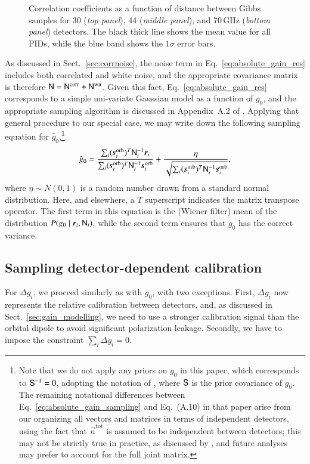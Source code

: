\documentclass[twocolumn]{aa}
\newcommand{\n}[0]{\vec{n}}
\newcommand{\N}[0]{\tens{N}}
\renewcommand{\S}[0]{\tens{S}}
\renewcommand{\r}[0]{\vec{r}}
\newcommand{\tot}[0]{^{\mathrm{tot}}}
\newcommand{\corr}[0]{^{\mathrm{corr}}}
\newcommand{\wn}[0]{^{\mathrm{wn}}}
\begin{document}
\begin{figure}[t]
    \caption{Correlation coefficients as a function of distance between Gibbs samples for 30 (\emph{top panel}), 44 (\emph{middle panel}), and 70\,GHz (\emph{bottom panel}) detectors. The black thick line shows the mean value for all PIDs, while the blue band shows the $1\sigma$ error bars.}
  \label{fig:corrlengths}
\end{figure}
As discussed in Sect.~\ref{sec:corrnoise}, the noise term in
Eq.~\eqref{eq:absolute_gain_res} includes both correlated and white
noise, and the appropriate covariance matrix is therefore $\N =
\N\corr + \N\wn$.  Given this fact, Eq.~\eqref{eq:absolute_gain_res}
corresponds to a simple uni-variate Gaussian model as a function of
$g_0$, and the appropriate sampling algorithm is discussed in
Appendix~A.2 of \citet{bp01}.  Applying that general procedure to our
special case, we may write down the following sampling equation for
$\hat{g}_0$,\footnote{Note that we do not apply any priors on $g_0$ in
  this paper, which corresponds to $\S^{-1}=0$, adopting the notation
  of \citet{bp01}, where $\S$ is the prior covariance of $g_0$. The
  remaining notational differences between
  Eq.~\eqref{eq:absolute_gain_sampling} and Eq.~(A.10) in that paper
  arise from our organizing all vectors and matrices in terms of
  independent detectors, using the fact that $\n\tot$ is assumed to be
  independent between detectors; this may not be strictly true in
  practice, as discussed by \citet{bp06}, and future analyses may
  prefer to account for the full joint matrix.}
\begin{equation}
    \hat{g}_0 = \frac{\sum_i (\vec{s}_i^{\mathrm{orb}})^T\N^{-1}_i\vec{r}_i}{\sum_i (\vec{s}_i^{\mathrm{orb}})^T\N_i^{-1}\vec{s}_i^{\mathrm{orb}}} + \frac{\eta}{\sqrt{\sum_i(\vec{s}_i^{\mathrm{orb}})^T\N_i^{-1}\vec{s}_i^{\mathrm{orb}}}},
    \label{eq:absolute_gain_sampling}
\end{equation}
where $\eta\sim N(0,1)$ is a random number drawn from a standard
normal distribution. Here, and elsewhere, a $T$ superscript indicates
the matrix transpose operator. The first term in this equation is the (Wiener
filter) mean of the distribution $P(g_0\mid\r_i, \N_i)$, while the second
term ensures that $g_0$ has the correct variance.

\subsection{Sampling detector-dependent calibration}
\label{sec:delta_gi_sampling}
For $\Delta g_i$, we proceed similarly as with $g_0$, with two
exceptions. First, $\Delta g_i$ now represents the relative
calibration between detectors, and, as discussed in
Sect.~\ref{sec:gain_modelling}, we need to use a stronger calibration
signal than the orbital dipole to avoid significant polarization
leakage. Secondly, we have to impose the constraint $\sum_i \Delta g_i
= 0$.
\end{document}
